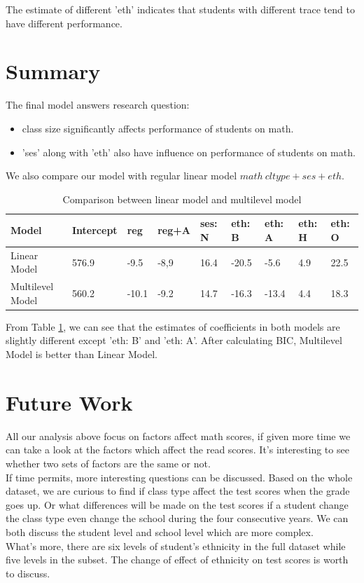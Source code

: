 \documentclass{article}
\begin{document}
The estimate of different 'eth' indicates that students with different trace tend to have different performance.\\

\section{Summary}

The final model answers research question: 
\begin{itemize}
    \item class size significantly affects performance of students on math.
    \item 'ses' along with 'eth' also have influence on performance of students on math.
\end{itemize}

We also compare our model with regular linear model $math ~ cltype + ses + eth$.

\begin{table}[h]
    \centering
    \caption{Comparison between linear model and multilevel model}
    \label{tab:lm}
    \begin{tabular}{|l|l|l|l|l|l|l|l|l|}
    \hline
    Model            & Intercept & reg         & reg+A         & ses: N & eth: B & eth: A & eth:  H & eth: O \\ \hline
    Linear Model     & 576.9     & -9.5        & -8,9          & 16.4   & -20.5  & -5.6   & 4.9     & 22.5   \\ \hline
    Multilevel Model & 560.2     & -10.1       & -9.2          & 14.7   & -16.3  & -13.4  & 4.4     & 18.3   \\ \hline
    \end{tabular}
\end{table}

From Table \ref{tab:lm}, we can see that the estimates of coefficients in both models are slightly different except 
'eth: B' and 'eth: A'. After calculating BIC, Multilevel Model is better than Linear Model.

\section{Future Work}

All our analysis above focus on factors affect math scores, if given more time we can take a look at the factors which affect the 
read scores. It’s interesting to see whether two sets of factors are the same or not.\\

If time permits, more interesting questions can be discussed. Based on the whole dataset, we are curious to find if class type 
affect the test scores when the grade goes up. Or what differences will be made on the test scores if a student change the class 
type even change the school during the four consecutive years. We can both discuss the student level and school level which are 
more complex.\\

What’s more, there are six levels of student’s ethnicity in the full dataset while five levels in the subset. The change of 
effect of ethnicity on test scores is worth to discuss.
\end{document}

